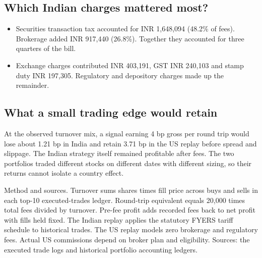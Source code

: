 \documentclass[12pt,a4paper,twoside,openany]{report}
\begin{document}
\subsection*{Which Indian charges mattered most?}
\begin{itemize}
\item Securities transaction tax accounted for INR 1,648,094 (48.2\% of fees). Brokerage added INR 917,440 (26.8\%). Together they accounted for three quarters of the bill.
\item Exchange charges contributed INR 403,191, GST INR 240,103 and stamp duty INR 197,305. Regulatory and depository charges made up the remainder.
\end{itemize}
\subsection*{What a small trading edge would retain}
At the observed turnover mix, a signal earning 4 bp gross per round trip would lose about 1.21 bp in India and retain 3.71 bp in the US replay before spread and slippage. The Indian strategy itself remained profitable after fees. The two portfolios traded different stocks on different dates with different sizing, so their returns cannot isolate a country effect.
\par\smallskip
{\small Method and sources. Turnover sums shares times fill price across buys and sells in each top-10 executed-trades ledger. Round-trip equivalent equals 20,000 times total fees divided by turnover. Pre-fee profit adds recorded fees back to net profit with fills held fixed. The Indian replay applies the statutory FYERS tariff schedule to historical trades. The US replay models zero brokerage and regulatory fees. Actual US commissions depend on broker plan and eligibility. Sources: the executed trade logs and historical portfolio accounting ledgers.}
\end{document}
